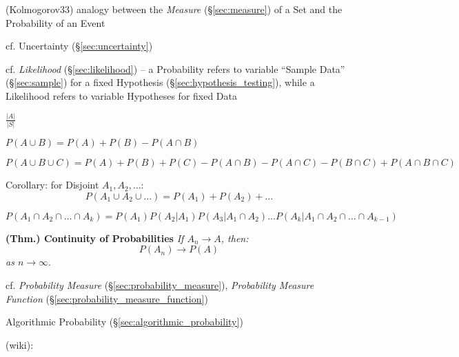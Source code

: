 (Kolmogorov33) analogy between the \emph{Measure} (\S\ref{sec:measure}) of a Set
and the Probability of an Event

cf. Uncertainty (\S\ref{sec:uncertainty})

cf. \emph{Likelihood} (\S\ref{sec:likelihood}) -- a Probability refers to
variable ``Sample Data'' (\S\ref{sec:sample}) for a fixed Hypothesis
(\S\ref{sec:hypothesis_testing}), while a Likelihood refers to variable
Hypotheses for fixed Data

$\frac{|A|}{|S|}$

$P(A \cup B) = P(A) + P(B) - P(A \cap B)$

$P(A \cup B \cup C) = P(A) + P(B) + P(C) - P(A \cap B) - P(A \cap C) -
P(B \cap C) + P(A \cap B \cap C)$

Corollary: for Disjoint $A_1, A_2, \ldots$:
\[
  P(A_1 \cup A_2 \cup \ldots) = P(A_1) + P(A_2) + \ldots
\]

$P(A_1 \cap A_2 \cap \ldots \cap A_k) = P(A_1) P(A_2 | A_1) P(A_3 |
A_1 \cap A_2) \ldots P(A_k | A_1 \cap A_2 \cap \ldots \cap A_{k-1})$

\textbf{(Thm.) Continuity of Probabilities} \emph{If $A_n \to A$, then:}
\[
  P(A_n) \to P(A)
\]
\emph{as $n \to \infty$}.

cf. \emph{Probability Measure} (\S\ref{sec:probability_measure}),
\emph{Probability Measure Function} (\S\ref{sec:probability_measure_function})

\fist Algorithmic Probability (\S\ref{sec:algorithmic_probability})

(wiki):

